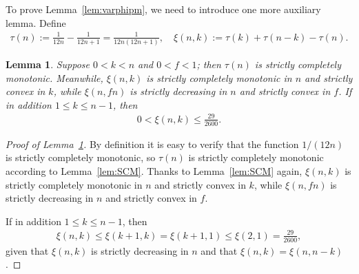 \documentclass[aop]{imsart}
\theoremstyle{plain}
\newtheorem{lemma}[theorem]{Lemma}
\theoremstyle{remark}
\newcommand{\1}{\operatorname{\uppercase\expandafter{\romannumeral1}}}
\newcommand{\2}{\operatorname{\uppercase\expandafter{\romannumeral2}}}
\newcommand{\3}{\operatorname{\uppercase\expandafter{\romannumeral3}}}
\newcommand{\4}{\operatorname{\uppercase\expandafter{\romannumeral4}}}
\newcommand{\5}{\operatorname{\uppercase\expandafter{\romannumeral5}}}
\newcommand{\6}{\operatorname{\uppercase\expandafter{\romannumeral6}}}
\newcommand{\7}{\operatorname{\uppercase\expandafter{\romannumeral7}}}
\newcommand{\8}{\operatorname{\uppercase\expandafter{\romannumeral8}}}
\newcommand{\9}{\operatorname{\uppercase\expandafter{\romannumeral9}}}
\newcommand{\lref}[1]{Lemma~\ref{#1}}
\begin{document}
To prove \lref{lem:varphipm}, we need to introduce one more auxiliary lemma. Define
\begin{align}
\tau(n):=\frac{1}{12n}-\frac{1}{12n+1}=\frac{1}{12n(12n+1)},\quad  \xi(n,k):=\tau(k)+\tau(n-k)-\tau(n). \label{eq:uv}
\end{align}
\begin{lemma}\label{lem:xi}
	Suppose $0<k<n$ and $0<f<1$; then $\tau(n)$ is
strictly completely monotonic. Meanwhile, 	$\xi(n,k)$ is strictly completely monotonic in $n$ and strictly convex in $k$, while $\xi(n,fn)$ is strictly decreasing in $n$ and  strictly convex in $f$.  If in addition $1\leq k\leq n-1$, then 
\begin{align}
	0< \xi(n,k)\leq \frac{29}{2600}. \label{eq:xiUB}
	\end{align}
\end{lemma}



\begin{proof}[Proof of \lref{lem:xi}]
By definition it is easy to verify that the function $1/(12n)$ is strictly completely monotonic, so $\tau(n)$ is strictly completely monotonic  according to \lref{lem:SCM}. 
Thanks to \lref{lem:SCM} again, 	$\xi(n,k)$ is strictly completely monotonic in $n$ and strictly convex in $k$, while $\xi(n,fn)$ is strictly decreasing in $n$ and  strictly convex in $f$. 

If in addition $1\leq k\leq n-1$, then 
	\begin{align}
	\xi(n,k)\leq \xi(k+1,k)=\xi(k+1,1)\leq \xi(2,1)=\frac{29}{2600}, 
	\end{align}
given that	$\xi(n,k)$	is strictly decreasing in $n$ and that 	$\xi(n,k)=\xi(n,n-k)$.  
\end{proof}
\end{document}
